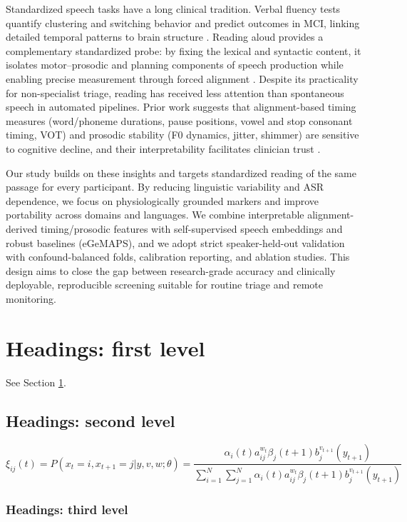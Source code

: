 \documentclass{article}
\begin{document}
Standardized speech tasks have a long clinical tradition. Verbal fluency tests quantify clustering and switching behavior and predict outcomes in MCI, linking detailed temporal patterns to brain structure \citep{fluency2016}. Reading aloud provides a complementary standardized probe: by fixing the lexical and syntactic content, it isolates motor–prosodic and planning components of speech production while enabling precise measurement through forced alignment \citep{mfa}. Despite its practicality for non-specialist triage, reading has received less attention than spontaneous speech in automated pipelines. Prior work suggests that alignment-based timing measures (word/phoneme durations, pause positions, vowel and stop consonant timing, VOT) and prosodic stability (F0 dynamics, jitter, shimmer) are sensitive to cognitive decline, and their interpretability facilitates clinician trust \citep{review2020,longitudinal2017}.

Our study builds on these insights and targets standardized reading of the same passage for every participant. By reducing linguistic variability and ASR dependence, we focus on physiologically grounded markers and improve portability across domains and languages. We combine interpretable alignment-derived timing/prosodic features with self-supervised speech embeddings and robust baselines (eGeMAPS), and we adopt strict speaker-held-out validation with confound-balanced folds, calibration reporting, and ablation studies. This design aims to close the gap between research-grade accuracy and clinically deployable, reproducible screening suitable for routine triage and remote monitoring.
\section{Headings: first level}
\label{sec:headings}

\lipsum[4] See Section \ref{sec:headings}.

\subsection{Headings: second level}
\lipsum[5]
\begin{equation}
	\xi _{ij}(t)=P(x_{t}=i,x_{t+1}=j|y,v,w;\theta)= {\frac {\alpha _{i}(t)a^{w_t}_{ij}\beta _{j}(t+1)b^{v_{t+1}}_{j}(y_{t+1})}{\sum _{i=1}^{N} \sum _{j=1}^{N} \alpha _{i}(t)a^{w_t}_{ij}\beta _{j}(t+1)b^{v_{t+1}}_{j}(y_{t+1})}}
\end{equation}

\subsubsection{Headings: third level}
\lipsum[6]
\end{document}
